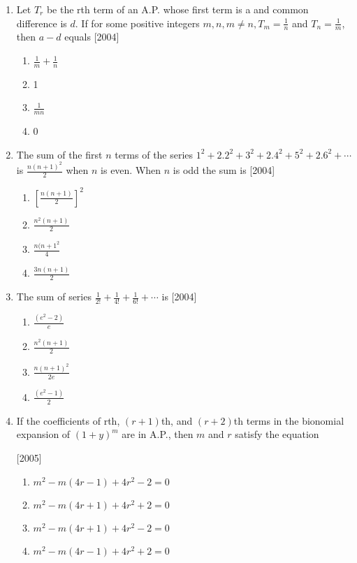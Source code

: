 \documentclass[journal,12pt,twocolumn]{IEEEtran}
\theoremstyle{remark}
\begin{document}
\begin{enumerate}[label={\arabic*.}]
\item {Let $T_r$ be the rth term of an A.P. whose first term is a and common difference is $d$. If for some positive integers $m,n, m\neq n, T_m = \frac{1}{n}$ and $T_n = \frac{1}{m}$, then $a-d$ equals} 
{\hfill{[2004]}}
\begin{enumerate}[label={(\alph*)}]
\item  {$\frac{1}{m}+\frac{1}{n}$}
\item  {1}
\item  {$\frac{1}{mn}$}
\item  {0}
\end{enumerate}

\item {The sum of the first $n$ terms of the series $1^2+2.2^2+3^2+2.4^2+5^2+2.6^2+\cdots$ is $\frac{n(n+1)^2}{2}$ when $n$ is even. When $n$ is odd the sum is}
{\hfill{[2004]}}
\begin{enumerate}[label={(\alph*)}]
\item  {$\left[\frac{n(n+1)}{2}\right]^2$}
\item  {$\frac{n^2(n+1)}{2}$}
\item  {$\frac{n(n+1^2}{4}$}
\item  {$\frac{3n(n+1)}{2}$}
\end{enumerate}

\item {The sum of series $\frac{1}{2!}+\frac{1}{4!}+\frac{1}{6!}+\cdots$ is}
{\hfill{[2004]}} 
\begin{enumerate}[label={(\alph*)}]
\item  {$\frac{(e^2-2)}{e}$}
\item  {$\frac{n^2(n+1)}{2}$}
\item  {$\frac{n(n+1)^2}{2e}$}
\item  {$\frac{(e^2-1)}{2}$}
\end{enumerate}

\item {If the coefficients of rth, $(r+1)$th, and $(r+2)$th terms in the bionomial expansion of $(1+y)^m$ are in A.P., then $m$ and $r$ satisfy the equation}

{\hfill{[2005]}} 
\begin{enumerate}[label={(\alph*)}]
\item  {$m^2-m(4r-1)+4r^2-2=0$}
\item  {$m^2-m(4r+1)+4r^2+2=0$}
\item  {$m^2-m(4r+1)+4r^2-2=0$}
\item  {$m^2-m(4r-1)+4r^2+2=0$}
\end{enumerate}


\end{enumerate}
\end{document}

